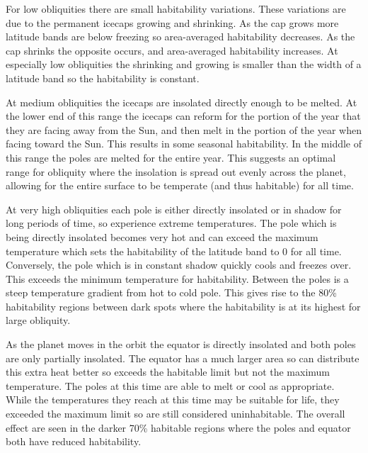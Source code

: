 \documentclass[12pt, onecolumn]{revtex4-2}    %
\begin{document}
For low obliquities there are small habitability variations.
These variations are due to the permanent icecaps growing and shrinking.
As the cap grows more latitude bands are below freezing so area-averaged habitability decreases.
As the cap shrinks the opposite occurs, and area-averaged habitability increases.
At especially low obliquities the shrinking and growing is smaller than the width of a latitude band so the habitability is constant.


At medium obliquities the icecaps are insolated directly enough to be melted.
At the lower end of this range the icecaps can reform for the portion of the year that they are facing away from the Sun, and then melt in the portion of the year when facing toward the Sun.
This results in some seasonal habitability.
In the middle of this range the poles are melted for the entire year.
This suggests an optimal range for obliquity where the insolation is spread out evenly across the planet, allowing for the entire surface to be temperate (and thus habitable) for all time.


At very high obliquities each pole is either directly insolated or in shadow for long periods of time, so experience extreme temperatures.
The pole which is being directly insolated becomes very hot and can exceed the maximum temperature which sets the habitability of the latitude band to 0 for all time.
Conversely, the pole which is in constant shadow quickly cools and freezes over. This exceeds the minimum temperature for habitability.
Between the poles is a steep temperature gradient from hot to cold pole.
This gives rise to the 80\% habitability regions between dark spots where the habitability is at its highest for large obliquity.

As the planet moves in the orbit the equator is directly insolated and both poles are only partially insolated.
The equator has a much larger area so can distribute this extra heat better so exceeds the habitable limit but not the maximum temperature.
The poles at this time are able to melt or cool as appropriate.
While the temperatures they reach at this time may be suitable for life, they exceeded the maximum limit so are still considered uninhabitable.
The overall effect are seen in the darker 70\% habitable regions where the poles and equator both have reduced habitability.
\end{document}
